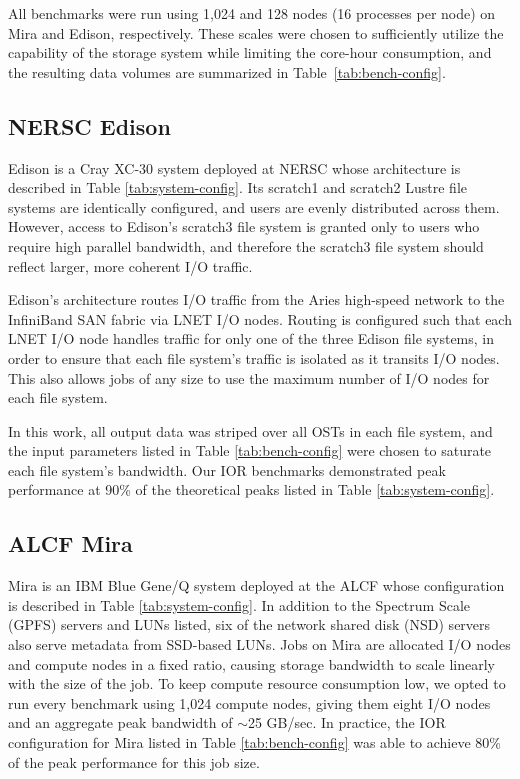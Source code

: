 All benchmarks were run using 1,024 and 128 nodes (16 processes per node) on Mira and Edison, respectively.
These scales were chosen to sufficiently utilize the capability of the storage system while limiting the core-hour consumption,
and the resulting data volumes are summarized in Table~\ref{tab:bench-config}.



\subsection{NERSC Edison} \label{sec:platforms/edison}

Edison is a Cray XC-30 system deployed at NERSC whose architecture is described in Table \ref{tab:system-config}.
Its scratch1 and scratch2 Lustre file systems are identically configured,
and users are evenly distributed across them.
However, access to Edison's scratch3 file system is granted only to users who require high parallel bandwidth, and therefore the scratch3 file system should reflect larger, more coherent I/O traffic.

Edison's architecture routes I/O traffic from the Aries high-speed network
to the InfiniBand SAN fabric via LNET I/O nodes.
Routing is configured such that each LNET I/O node handles traffic for only one of the three Edison file systems, in order to ensure that each file system's traffic is isolated as it transits I/O nodes.
This also allows jobs of any size to use the maximum number of I/O nodes for each file system.

In this work, all output data was striped over all OSTs in each file system, and the input parameters listed in Table \ref{tab:bench-config} were chosen to saturate each file system's bandwidth.
Our IOR benchmarks demonstrated peak performance at 90\% of the theoretical peaks listed in Table \ref{tab:system-config}.

\subsection{ALCF Mira} \label{sec:platforms/mira}

Mira is an IBM Blue Gene/Q system deployed at the ALCF whose configuration is described in Table \ref{tab:system-config}.
In addition to the Spectrum Scale (GPFS) servers and LUNs listed, six of the network shared disk (NSD) servers also serve metadata from SSD-based LUNs.
Jobs on Mira are allocated I/O nodes and compute nodes in a fixed ratio, causing storage bandwidth to scale linearly with the size of the job.
To keep compute resource consumption low, we opted to run every benchmark using 1,024 compute nodes, giving them eight I/O nodes and an aggregate peak bandwidth of $\sim$25 GB/sec.
In practice, the IOR configuration for Mira listed in Table
\ref{tab:bench-config} was able to achieve 80\% of the peak performance for
this job size.

